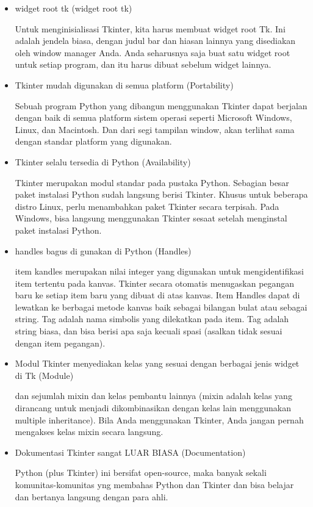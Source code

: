 \begin{itemize}
	\item widget root tk (widget root tk)\vspace{\baselineskip} \par
	Untuk menginisialisasi Tkinter, kita harus membuat widget root Tk. Ini adalah jendela biasa, dengan judul bar dan hiasan lainnya yang disediakan oleh window manager Anda. Anda seharusnya saja buat satu widget root untuk setiap program, dan itu harus dibuat sebelum widget lainnya. \par
\noindent 
	\item Tkinter mudah digunakan di semua platform (Portability)\vspace{\baselineskip} \par
	Sebuah program Python yang dibangun menggunakan Tkinter dapat berjalan dengan baik di semua platform sistem operasi seperti Microsoft Windows, Linux, dan Macintosh. Dan dari segi tampilan window, akan terlihat sama dengan standar platform yang digunakan. \par
\noindent 
	\item Tkinter selalu tersedia di Python (Availability)\vspace{\baselineskip} \par
	Tkinter merupakan modul standar pada pustaka Python. Sebagian besar paket instalasi Python sudah langsung berisi Tkinter. Khusus untuk beberapa distro Linux, perlu menambahkan paket Tkinter secara terpisah. Pada Windows, bisa langsung menggunakan Tkinter sesaat setelah menginstal paket instalasi Python. \par
\noindent 
	\item handles bagus di gunakan di Python (Handles)\vspace{\baselineskip} \par
	item kandles merupakan nilai integer yang digunakan untuk mengidentifikasi item tertentu pada kanvas. Tkinter secara otomatis menugaskan pegangan baru ke setiap item baru yang dibuat di atas kanvas. Item Handles dapat di lewatkan ke berbagai metode kanvas baik sebagai bilangan bulat atau sebagai string. Tag adalah nama simbolis yang dilekatkan pada item. Tag adalah string biasa, dan bisa berisi apa saja kecuali spasi (asalkan tidak sesuai dengan item pegangan). \par
\noindent 
	\item Modul Tkinter menyediakan kelas yang sesuai dengan berbagai jenis widget di Tk (Module)\vspace{\baselineskip} \par
	dan sejumlah mixin dan kelas pembantu lainnya (mixin adalah kelas yang dirancang untuk menjadi dikombinasikan dengan kelas lain menggunakan multiple inheritance). Bila Anda menggunakan Tkinter, Anda jangan pernah mengakses kelas mixin secara langsung. \par
\noindent 
	\item Dokumentasi Tkinter sangat LUAR BIASA (Documentation)\vspace{\baselineskip} \par
	Python (plus Tkinter) ini bersifat open-source, maka banyak sekali komunitas-komunitas yng membahas Python dan Tkinter dan bisa belajar dan bertanya langsung dengan para ahli.
\end{itemize}



